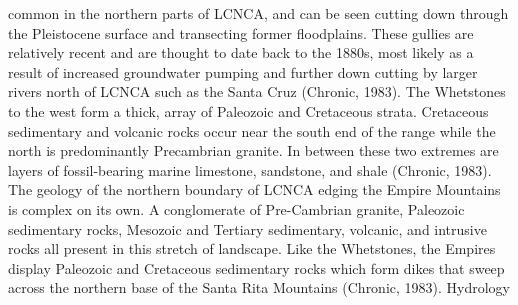 \documentclass{article}
\begin{document}
common in the northern parts of LCNCA, and can be seen cutting down through the Pleistocene surface and transecting former floodplains. These gullies are relatively recent and are thought to date back to the 1880s, most likely as a result of increased groundwater pumping and further down cutting by larger rivers north of LCNCA such as the Santa Cruz (Chronic, 1983). The Whetstones to the west form a thick, array of Paleozoic and Cretaceous strata. Cretaceous sedimentary and volcanic rocks occur near the south end of the range while the north is predominantly Precambrian granite. In between these two extremes are layers of fossil-bearing marine limestone, sandstone, and shale (Chronic, 1983). The geology of the northern boundary of LCNCA edging the Empire Mountains is complex on its own. A conglomerate of Pre-Cambrian granite, Paleozoic sedimentary rocks, Mesozoic and Tertiary sedimentary, volcanic, and intrusive rocks all present in this stretch of landscape. Like the Whetstones, the Empires display Paleozoic and Cretaceous sedimentary rocks which form dikes that sweep across the northern base of the Santa Rita Mountains (Chronic, 1983).
Hydrology
\end{document}
